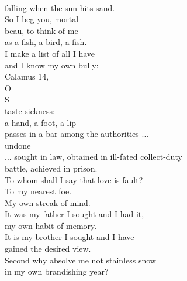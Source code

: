 \documentclass[smalldemyvopaper,11pt,twoside,onecolumn,openright,extrafontsizes]{memoir}
\begin{document}
\\falling when the sun hits sand.
\\So I beg you, mortal
\\beau, to think of me
\\as a fish, a bird, a fish.
\\I make a list of all I have
\\and I know my own bully:
\\Calamus 14,
\\O
\\S
\\taste-sickness:
\\a hand, a foot, a lip
\\passes in a bar among the authorities ...
\\undone
\\... sought in law, obtained in ill-fated collect-duty
\\battle, achieved in prison.
\\To whom shall I say that love is fault?
\\To my nearest foe.
\\My own streak of mind.
\\It was my father I sought and I had it,
\\my own habit of memory.
\\It is my brother I sought and I have
\\gained the desired view.
\\Second why absolve me not stainless snow
\\in my own brandishing year?
\end{document}
